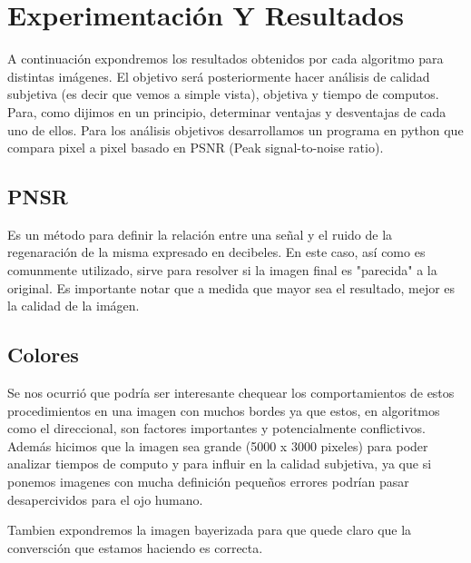 \section{Experimentación Y Resultados}

A continuación expondremos los resultados obtenidos por cada algoritmo para distintas imágenes. El objetivo será posteriormente hacer análisis de calidad subjetiva (es decir que vemos a simple vista), objetiva y tiempo de computos. Para, como dijimos en un principio, determinar ventajas y desventajas de cada uno de ellos. Para los análisis objetivos desarrollamos un programa en python que compara pixel a pixel basado en PSNR (Peak signal-to-noise ratio). 

\subsection{PNSR}
Es un método para definir la relación entre una señal y el ruido de la regenaración de la misma expresado en decibeles. En este caso, así como es comunmente utilizado, sirve para resolver si la imagen final es "parecida" a la original. Es importante notar que a medida que mayor sea el resultado, mejor es la calidad de la imágen.

\subsection{Colores}

Se nos ocurrió que podría ser interesante chequear los comportamientos de estos procedimientos en una imagen con muchos bordes ya que estos, en algoritmos como el direccional, son factores importantes y potencialmente conflictivos. Además hicimos que la imagen sea grande (5000 x 3000 pixeles) para poder analizar tiempos de computo y para influir en la calidad subjetiva, ya que si ponemos imagenes con mucha definición pequeños errores podrían pasar desapercividos para el ojo humano.

Tambien expondremos la imagen bayerizada para que quede claro que la conversción que estamos haciendo es correcta.

